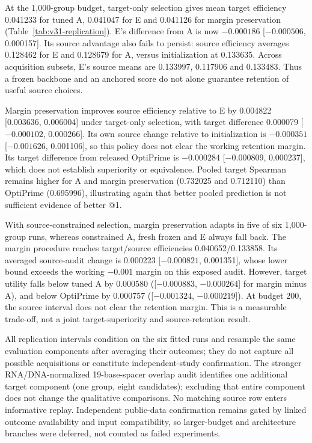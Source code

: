 At the 1{,}000-group budget, target-only selection gives mean target efficiency
0.041233 for tuned A, 0.041047 for E and 0.041126 for margin preservation
(Table~\ref{tab:v31-replication}). E's difference from A is now
$-0.000186$ [${-}0.000506$, 0.000157]. Its source advantage also fails to
persist: source efficiency averages 0.128462 for E and 0.128679 for A, versus
initialization at 0.133635. Across acquisition subsets, E's source means are
0.133997, 0.117906 and 0.133483. Thus a frozen backbone and an anchored score do
not alone guarantee retention of useful source choices.

Margin preservation improves source efficiency relative to E by 0.004822
[0.003636, 0.006004] under target-only selection, with target difference
0.000079 [${-}0.000102$, 0.000266]. Its own source change relative to
initialization is $-0.000351$ [${-}0.001626$, 0.001106], so this policy does not
clear the working retention margin. Its target difference from released
OptiPrime is $-0.000284$ [${-}0.000809$, 0.000237], which does not establish
superiority or equivalence. Pooled target Spearman remains higher for A and
margin preservation (0.732025 and 0.712110) than OptiPrime (0.695996), illustrating
again that better pooled prediction is not sufficient evidence of better @1.

With source-constrained selection, margin preservation adapts in five of six
1{,}000-group runs, whereas constrained A, fresh frozen and E always fall back.
The margin procedure reaches target/source efficiencies 0.040652/0.133858.
Its averaged source-audit change is 0.000223 [${-}0.000821$, 0.001351], whose
lower bound exceeds the working $-0.001$ margin on this exposed audit.
However, target utility falls below tuned A by 0.000580
([${-}0.000883$, ${-}0.000264$] for margin minus A), and below OptiPrime by
0.000757 ([${-}0.001324$, ${-}0.000219$]). At budget 200, the source interval
does not clear the retention margin. This is a measurable trade-off, not a
joint target-superiority and source-retention result.

All replication intervals condition on the six fitted runs and resample the
same evaluation components after averaging their outcomes; they do not capture
all possible acquisitions or constitute independent-study confirmation. The
stronger RNA/DNA-normalized 19-base-spacer overlap audit identifies one additional
target component (one group, eight candidates); excluding that entire component
does not change the qualitative comparisons. No matching source row enters
informative replay. Independent public-data confirmation remains gated by
linked outcome availability and input compatibility, so larger-budget and
architecture branches were deferred, not counted as failed experiments.


